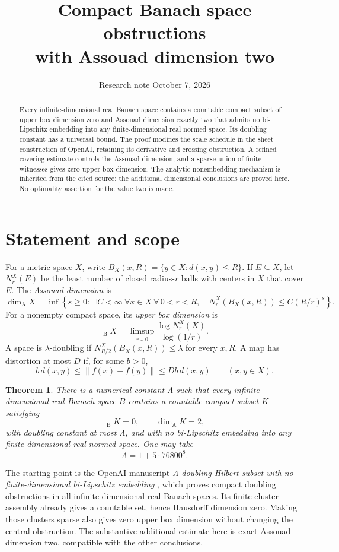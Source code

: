 \documentclass[11pt]{article}
\title{Compact Banach space obstructions\texorpdfstring{\\}{ }with Assouad dimension two}
\author{}
\date{Research note \quad October 7, 2026}
\newtheorem{theorem}{Theorem}[section]
\theoremstyle{remark}
\newcommand{\norm}[1]{\lVert#1\rVert}
\newcommand{\dimA}{\dim_{\mathrm A}}
\newcommand{\dimB}{\mathop{\overline{\dim}}\nolimits_{\mathrm B}}
\begin{document}
\maketitle
\vspace{-1.2em}
\begin{abstract}
Every infinite-dimensional real Banach space contains a countable compact subset of upper box dimension zero and Assouad dimension exactly two that admits no bi-Lipschitz embedding into any finite-dimensional real normed space. Its doubling constant has a universal bound. The proof modifies the scale schedule in the sheet construction of OpenAI, retaining its derivative and crossing obstruction. A refined covering estimate controls the Assouad dimension, and a sparse union of finite witnesses gives zero upper box dimension. The analytic nonembedding mechanism is inherited from the cited source; the additional dimensional conclusions are proved here. No optimality assertion for the value two is made.
\end{abstract}

\section{Statement and scope}
For a metric space $X$, write $B_X(x,R)=\{y\in X:d(x,y)\le R\}$. If $E\subseteq X$, let $N_r^X(E)$ be the least number of closed radius-$r$ balls with centers in $X$ that cover $E$. The \emph{Assouad dimension} is
\[
 \dimA X=\inf\left\{s\ge0:\ \exists C<\infty\ \forall x\in X\ \forall\,0<r<R,
 \quad N_r^X(B_X(x,R))\le C(R/r)^s\right\}.
\]
For a nonempty compact space, its \emph{upper box dimension} is
\[
 \dimB X=\limsup_{r\downarrow0}\frac{\log N_r^X(X)}{\log(1/r)}.
\]
A space is $\lambda$-doubling if $N_{R/2}^X(B_X(x,R))\le\lambda$ for every $x,R$. A map has distortion at most $D$ if, for some $b>0$,
\[
 b\,d(x,y)\le\norm{f(x)-f(y)}\le Db\,d(x,y)\qquad(x,y\in X).
\]

\begin{theorem}\label{thm:main}
There is a numerical constant $\Lambda$ such that every infinite-dimensional real Banach space $B$ contains a countable compact subset $K$ satisfying
\[
 \dimB K=0,\qquad \dimA K=2,
\]
with doubling constant at most $\Lambda$, and with no bi-Lipschitz embedding into any finite-dimensional real normed space. One may take
\[
 \Lambda=1+5\cdot 76800^8.
\]
\end{theorem}

The starting point is the OpenAI manuscript \emph{A doubling Hilbert subset with no finite-dimensional bi-Lipschitz embedding} \cite{OpenAI}, which proves compact doubling obstructions in all infinite-dimensional real Banach spaces. Its finite-cluster assembly already gives a countable set, hence Hausdorff dimension zero. Making those clusters sparse also gives zero upper box dimension without changing the central obstruction. The substantive additional estimate here is exact Assouad dimension two, compatible with the other conclusions.
\end{document}
